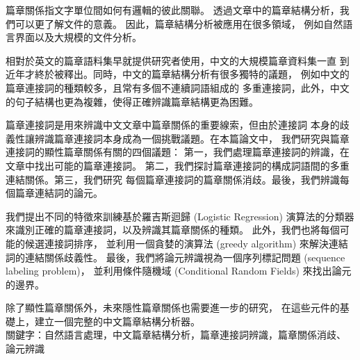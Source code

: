 \begin{abstractzh}

篇章關係指文字單位間如何有邏輯的彼此關聯。
透過文章中的篇章結構分析，我們可以更了解文件的意義。
因此，篇章結構分析被應用在很多領域，
例如自然語言界面以及大規模的文件分析。

相對於英文的篇章語料集早就提供研究者使用，中文的大規模篇章資料集一直
到近年才終於被釋出。同時，中文的篇章結構分析有很多獨特的議題，
例如中文的篇章連接詞的種類較多，且常有多個不連續詞語組成的
多重連接詞，此外，中文的句子結構也更為複雜，使得正確辨識篇章結構更為困難。

篇章連接詞是用來辨識中文文章中篇章關係的重要線索，但由於連接詞
本身的歧義性讓辨識篇章連接詞本身成為一個挑戰議題。在本篇論文中，
我們研究與篇章連接詞的顯性篇章關係有關的四個議題：
第一，我們處理篇章連接詞的辨識，在文章中找出可能的篇章連接詞。
第二，我們探討篇章連接詞的構成詞語間的多重連結關係。第三，我們研究
每個篇章連接詞的篇章關係消歧。最後，我們辨識每個篇章連結詞的論元。

我們提出不同的特徵來訓練基於羅吉斯迴歸 (Logistic Regression)
演算法的分類器來識別正確的篇章連接詞，以及辨識其篇章關係的種類。
此外，我們也將每個可能的候選連接詞排序，
並利用一個貪婪的演算法 (greedy algorithm) 來解決連結詞的連結關係歧義性。
最後，我們將論元辨識視為一個序列標記問題 (sequence labeling problem)，
並利用條件隨機域 (Conditional Random Fields) 來找出論元的邊界。

除了顯性篇章關係外，未來隱性篇章關係也需要進一步的研究，
在這些元件的基礎上，建立一個完整的中文篇章結構分析器。 \\

\noindent
關鍵字：自然語言處理，中文篇章結構分析，篇章連接詞辨識，篇章關係消歧、
論元辨識

\end{abstractzh}

